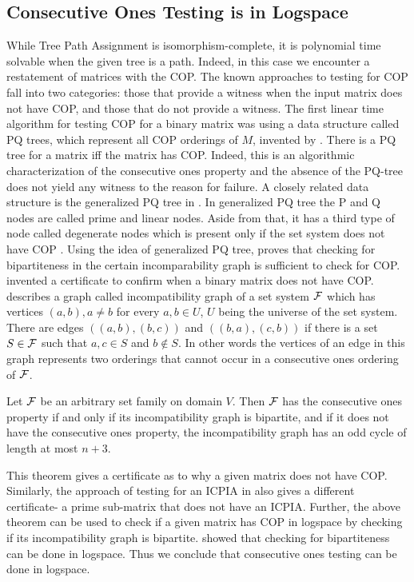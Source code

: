 \documentclass{llncs}
\def\cF{{\cal F}}
\begin{document}
\subsection{Consecutive Ones Testing is in Logspace}
While Tree Path Assignment is isomorphism-complete, it is polynomial
time solvable when the given tree is a path.  Indeed, in this case we
encounter a restatement of matrices with the COP.  The known
approaches to testing for COP fall into two categories: those that
provide a witness when the input matrix does not have COP, and those
that do not provide a witness.  The first linear time algorithm for
testing COP for a binary matrix was using a data structure called PQ
trees, which represent all COP orderings of $M$, invented by
\cite{bl76}. There is a PQ tree for a matrix iff the matrix has COP.
Indeed, this is an algorithmic characterization of the consecutive
ones property and the absence of the PQ-tree does not yield any
witness to the reason for failure.  A closely related data structure
is the generalized PQ tree in \cite{mcc04}.  In generalized PQ tree
the P and Q nodes are called prime and linear nodes. Aside from that,
it has a third type of node called degenerate nodes which is present
only if the set system does not have COP \cite{mcc04}.  Using the idea
of generalized PQ tree, \cite{mcc04} proves that checking for
bipartiteness in the certain incomparability graph is sufficient to
check for COP.  \cite{mcc04} invented a certificate to confirm when a
binary matrix does not have COP.  \cite{mcc04} describes a graph
called incompatibility graph of a set system $\cF$ which has vertices
$(a,b), a \ne b$ for every $a, b \in U$, $U$ being the universe of the
set system. There are edges $((a,b),(b,c))$ and $((b,a),(c,b))$ if
there is a set $S \in \cF$ such that $a, c \in S$ and $b \notin S$. In
other words the vertices of an edge in this graph represents two
orderings that cannot occur in a consecutive ones ordering of $\cF$.
\begin{theorem}
  Let $\cF$ be an arbitrary set family on domain $V$. Then $\cF$ has
  the consecutive ones property if and only if its incompatibility
  graph is bipartite, and if it does not have the consecutive ones
  property, the incompatibility graph has an odd cycle of length at
  most $n+3$.
\end{theorem}
This theorem gives a certificate as to why a given matrix does not
have COP.  Similarly, the approach of testing for an ICPIA in
\cite{nsnrs09} also gives a different certificate- a prime sub-matrix
that does not have an ICPIA.  Further, the above theorem can be used
to check if a given matrix has COP in logspace by checking if its
incompatibility graph is bipartite. \cite{rei84} showed that checking
for bipartiteness can be done in logspace. Thus we conclude that
consecutive ones testing can be done in logspace.
\end{document}
